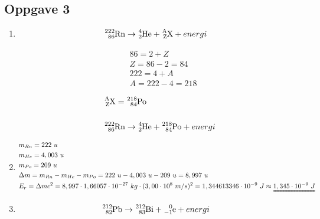 \documentclass[11pt,a4paper]{report}
\newcommand{\opgd}[1]{\item[#1)]}
\newcommand{\opg}[1]{\subsection*{Oppgave #1}}
\begin{document}

\newpage
\opg{3}
\begin{enumerate}[leftmargin=*,itemsep=1cm,labelsep=2em,label=\alph*)]
\opgd{a}

{\huge
\begin{align*}
&\ce{^{222}_{86}Rn} \rightarrow \ce{^{4}_{2}He} + \ce{^{A}_{Z}X} + energi
\end{align*}
}%

\begin{align*}
&86 = 2 + Z\\
&Z = 86 - 2 = 84\\
&222 = 4 + A\\
&A = 222 - 4 = 218
\end{align*}

{\huge
\begin{align*}
&\ce{^{A}_{Z}X} = \ce{^{218}_{84}Po}\\[0.5cm]
&\ce{^{222}_{86}Rn} \rightarrow \ce{^{4}_{2}He} + \ce{^{218}_{84}Po} + energi
\end{align*}
}%

\opgd{b}
\begin{align*}
&m_{Rn} = 222\ u\\
&m_{He} = 4,003\ u\\
&m_{Po} = 209\ u\\
&\Delta m = m_{Rn} - m_{He} - m_{Po} = 222\ u - 4,003\ u - 209\ u = 8,997\ u\\
&E_r = \Delta mc^2 = 8,997 \cdot 1,66057 \cdot 10^{-27}\ kg \cdot (3,00 \cdot 10^8\ m/s)^2 = 1,344613346 \cdot 10^{-9}\ J \approx \uuline{1,345 \cdot 10^{-9}\ J}
\end{align*}

\opgd{c}
{\huge
\begin{align*}
&\ce{^{212}_{82}Pb} \rightarrow \ce{^{212}_{83}Bi} + \ce{^{0}_{-1}e} + energi
\end{align*}
}%
\end{enumerate}
\end{document}
